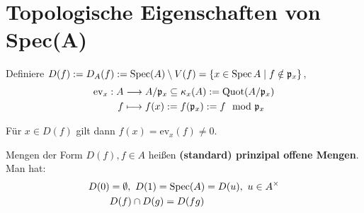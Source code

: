 \section{Topologische Eigenschaften von Spec(A)}
\label{sec:topologische-eigenschaften-von-spec-A}

Definiere $D(f):=D_{A}(f):=\operatorname{Spec}(A)\setminus V(f)=\{x \in\operatorname{Spec} A \mid f\notin\mathfrak{p}_{x}\}$,
\begin{align*}
  \text{ev}_{x}:A & \longrightarrow A/\mathfrak{p}_{x}\subseteq \kappa_{x}(A) := \operatorname{Quot}(A/\mathfrak{p}_{x})\\
  f & \longmapsto f(x) := f(\mathfrak{p}_{x}) := f \mod \mathfrak{p}_{x}
\end{align*}

Für $x \in D(f)$ gilt dann $f(x) = \text{ev}_{x}(f) \neq 0$.

Mengen der Form $D(f), f\in A$ heißen \textbf{(standard) prinzipal offene Mengen}. Man hat:
\begin{align*}
  D(0) & =\emptyset,\ D(1)=\operatorname{Spec}(A)=D(u),\ u\in A^{\times}\\    
  & D(f)\cap D(g) = D(fg)
\end{align*}

